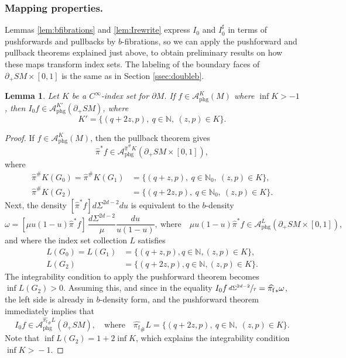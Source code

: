 \documentclass[11pt]{article}
\theoremstyle{plain}
\newtheorem{Lemma}[Theorem]{Lemma}
\theoremstyle{definition}
\theoremstyle{remark}
\def\Nm{{\mathbb{N}}}
\def\A{\mathcal{A}}
\newcommand{\adj}{I_0^\sharp}
\newcommand{\hpi}{\widehat{\pi}}
\newcommand{\phg}{\mathrm{phg}}
\newcommand{\foot}{{\pi_{\mathrm f}}}
\newcommand{\hF}{\widehat{\foot}}
\begin{document}
\subsubsection*{Mapping properties.} Lemmas \ref{lem:bfibrations} and \ref{lem:Irewrite} express $I_0$ and $\adj $ in terms of pushforwards and pullbacks by $b$-fibrations, so we can apply the pushforward and pullback theorems explained just above, to obtain preliminary results on how these maps transform index sets. The labeling of the boundary faces of $\partial_+ SM\times [0,1]$ is the same as in Section \ref{ssec:doubleb}.

\begin{Lemma}\label{lem:xray}
Let $K$ be a $C^\infty$-index set for $\partial M$. If $f\in \A_{\phg}^K (M)$ where $\inf K >-1$, then $I_0 f \in \A_{\phg}^{K'}(\partial_+ SM)$, where\vspace*{-3pt}
\begin{equation*}
K' = \{(q + 2z, p),\ q\in \Nm,\ (z,p)\in K\}.
\end{equation*}
\end{Lemma}
\begin{proof}
If $f\in \A_{\phg}^K(M)$, then the pullback theorem gives\vspace*{-3pt}
\begin{equation*}
\hpi^* f \in \A_{\phg}^{\hpi^\# K}(\partial_+ SM\times [0,1]),
\end{equation*}
where\vspace*{-3pt}
\begin{align*}
\hpi^\# K (G_0) = \hpi^\# K (G_1) &= \{(q + z, p),\ q\in \Nm_0,\ (z,p)\in K\},\\
\hpi^\# K (G_2) &= \{(q + 2z, p),\ q\in \Nm_0,\ (z,p)\in K\}.
\end{align*}
Next, the density $[\hpi^* f]d\Sigma^{2d-2} du$ is equivalent to the $b$-density\vspace*{-3pt}
\begin{equation*}
\omega = [\mu u(1-u) \hpi^* f]\, \frac{d\Sigma^{2d-2}}{\mu} \frac{du}{u(1-u)}, \ \text{where} \quad \mu u(1-u) \hpi^* f \in \A_{\phg}^L (\partial_+ SM \times [0,1]),
\end{equation*}
and where the index set collection $L$ satisfies\vspace*{-3pt}
\begin{align*}
L(G_0) = L(G_1) &= \{(q + z, p), q\in \Nm, (z,p)\in K\}, \\
L(G_2) &= \{(q + 2z, p), q\in \Nm, (z,p)\in K\}.
\end{align*}
The integrability condition to apply the pushforward theorem becomes $\inf L(G_2) > 0$. Assuming this, and since in the equality $I_0 f\, \sfrac{d\Sigma^{2d-2}}{\tau} = \hF_* \omega$, the left side is already in $b$-density form, and the pushforward theorem immediately implies that
\begin{equation*}
I_0 f \in \A_{\phg}^{\hF_\# L} (\partial_+ SM), \quad \text{where} \quad \hF_\# L = \{(q + 2z, p),\ q\in \Nm,\ (z,p)\in K\}.
\end{equation*}
Note that $\inf L(G_2) \!=\! 1 + 2 \inf K$, which explains the integrability condition \hbox{$\inf K \!>\! -1$}.
\end{proof}
\end{document}

